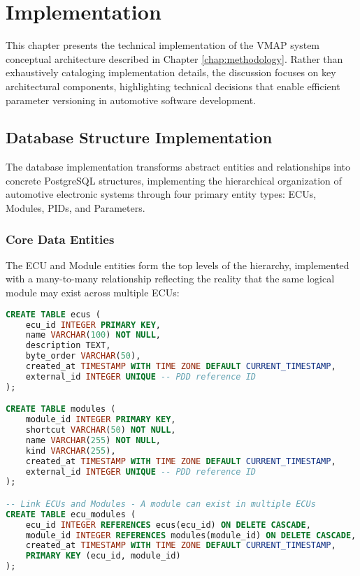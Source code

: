 \chapter{Implementation}
\label{chap:implementation}

This chapter presents the technical implementation of the VMAP system conceptual architecture described in Chapter \ref{chap:methodology}. Rather than exhaustively cataloging implementation details, the discussion focuses on key architectural components, highlighting technical decisions that enable efficient parameter versioning in automotive software development.

\section{Database Structure Implementation}
\label{sec:database-structure-implementation}

The database implementation transforms abstract entities and relationships into concrete PostgreSQL structures, implementing the hierarchical organization of automotive electronic systems through four primary entity types: ECUs, Modules, PIDs, and Parameters.

\subsection{Core Data Entities}
\label{subsec:core-data-entities}

The ECU and Module entities form the top levels of the hierarchy, implemented with a many-to-many relationship reflecting the reality that the same logical module may exist across multiple ECUs:

\begin{lstlisting}[language=SQL, caption={ECU and Module Table Implementation}, label={lst:ecu-module-tables}]
CREATE TABLE ecus (
    ecu_id INTEGER PRIMARY KEY,
    name VARCHAR(100) NOT NULL,
    description TEXT,
    byte_order VARCHAR(50),
    created_at TIMESTAMP WITH TIME ZONE DEFAULT CURRENT_TIMESTAMP,
    external_id INTEGER UNIQUE -- PDD reference ID
);

CREATE TABLE modules (
    module_id INTEGER PRIMARY KEY,
    shortcut VARCHAR(50) NOT NULL,
    name VARCHAR(255) NOT NULL,
    kind VARCHAR(255),
    created_at TIMESTAMP WITH TIME ZONE DEFAULT CURRENT_TIMESTAMP,
    external_id INTEGER UNIQUE -- PDD reference ID
);

-- Link ECUs and Modules - A module can exist in multiple ECUs
CREATE TABLE ecu_modules (
    ecu_id INTEGER REFERENCES ecus(ecu_id) ON DELETE CASCADE,
    module_id INTEGER REFERENCES modules(module_id) ON DELETE CASCADE,
    created_at TIMESTAMP WITH TIME ZONE DEFAULT CURRENT_TIMESTAMP,
    PRIMARY KEY (ecu_id, module_id)
);
\end{lstlisting}

